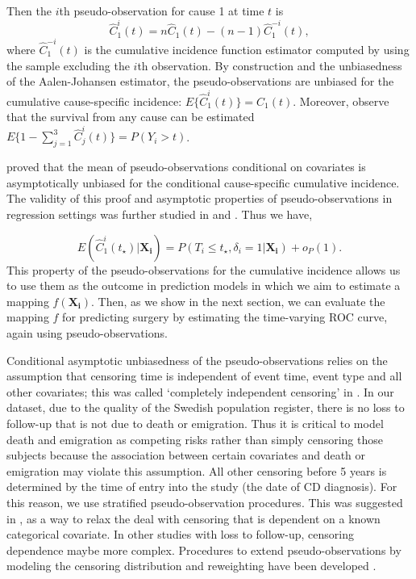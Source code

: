 \documentclass{statsoc}
\begin{document}
Then the $i$th pseudo-observation for cause 1 at time $t$ is 
\[
\hat{C}^i_1(t) = n \hat{C}_1(t) - (n - 1) \hat{C}_1^{-i}(t), 
\]
where $\hat{C}^{-i}_1(t)$ is the cumulative incidence function estimator computed by using the sample excluding the $i$th observation. By construction and the unbiasedness of the Aalen-Johansen estimator, the pseudo-observations are unbiased for the cumulative cause-specific incidence: $E\{\hat{C}^i_1(t)\} = C_1(t).$ Moreover, observe that the survival from any cause can be estimated $E\{1 - \sum_{j=1}^3\hat{C}^i_j(t)\} = P(Y_i > t)$.

\citet{graw2009pseudo} proved that the mean of pseudo-observations conditional on covariates is asymptotically unbiased for the conditional cause-specific cumulative incidence. The validity of this proof and asymptotic properties of pseudo-observations in regression settings was further studied in \citet{overgaard2017asymptotic} and \citet{jacobsen2016note}. Thus we have,

\[
E(\hat{C}^i_1(t_{\star}) | \mathbf{X_i}) = P(T_i \leq t_{\star}, \delta_i = 1 |  \mathbf{X_i}) + o_P(1). 
\]
This property of the pseudo-observations for the cumulative incidence allows us to use them as the outcome in prediction models in which we aim to estimate a mapping $f(\mathbf{X_i})$. Then, as we show in the next section, we can evaluate the mapping $f$ for predicting surgery by estimating the time-varying ROC curve, again using pseudo-observations. 

Conditional asymptotic unbiasedness of the pseudo-observations relies on the assumption that censoring time is independent of event time, event type and all other covariates; this was called `completely independent censoring' in \citet{overgaard2017asymptotic}. In our dataset, due to the quality of the Swedish population register, there is no loss to follow-up that is not due to death or emigration. Thus it is critical to model death and emigration as competing risks rather than simply censoring those subjects because the association between certain covariates and death or emigration may violate this assumption. All other censoring before 5 years is determined by the time of entry into the study (the date of CD diagnosis). For this reason, we use stratified pseudo-observation procedures. This was suggested in \citet{andersen2010pseudo}, as a way to relax the deal with censoring that is dependent on a known categorical covariate. In other studies with loss to follow-up, censoring dependence maybe more complex. Procedures to extend pseudo-observations by modeling the censoring distribution and reweighting have been developed \citep{binder2014pseudo}.
\end{document}
